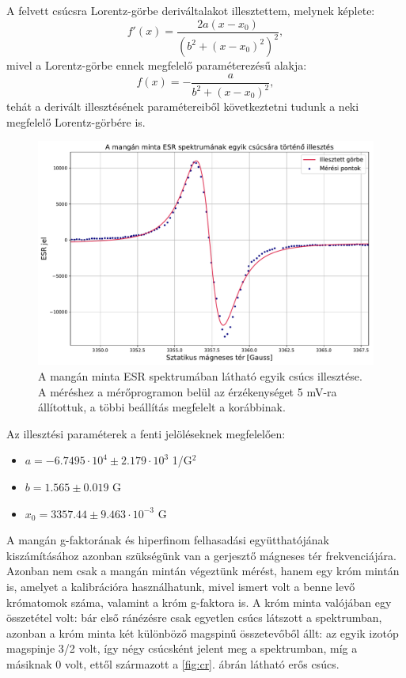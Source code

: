 \documentclass[12pt,a4paper]{article}
\begin{document}
\newline
A felvett csúcsra Lorentz-görbe deriváltalakot illesztettem, melynek képlete:
\begin{equation}
f'(x)=\frac{2a(x-x_{0})}{(b^2+(x-x_{0})^2)^2},
\end{equation}
mivel a Lorentz-görbe ennek megfelelő paraméterezésű alakja:
\begin{equation}
f(x)=- \frac{a}{b^2+(x-x_{0})^2},
\end{equation}
 tehát a derivált illesztésének paramétereiből következtetni tudunk a neki megfelelő Lorentz-görbére is.\\
\begin{figure}[!h]
\centering
\includegraphics[scale=0.5]{mang_reszl}
\caption{A mangán minta ESR spektrumában látható egyik csúcs illesztése. A méréshez a mérőprogramon belül az érzékenységet 5 mV-ra állítottuk, a többi beállítás megfelelt a korábbinak.}
\label{fig:mn_csucs}
\end{figure}
\newline
Az illesztési paraméterek a fenti jelöléseknek megfelelően:
\begin{itemize}
\item{$a=-6.7495 \cdot 10^{4} \pm 2.179 \cdot 10^{3}$ 1/G$^2$}
\item{$b=1.565 \pm 0.019$ G}
\item{$x_0=3357.44 \pm 9.463 \cdot 10^{-3}$ G}
\end{itemize}
\newpage
A mangán g-faktorának és hiperfinom felhasadási együtthatójának kiszámításához azonban szükségünk van a gerjesztő mágneses tér frekvenciájára. Azonban nem csak a mangán mintán végeztünk mérést, hanem egy króm mintán is, amelyet a kalibrációra használhatunk, mivel ismert volt a benne levő krómatomok száma, valamint a króm g-faktora is. A króm minta valójában egy összetétel volt: bár első ránézésre csak egyetlen csúcs látszott a spektrumban, azonban a króm minta két különböző magspinű összetevőből állt: az egyik izotóp magspinje 3/2 volt, így négy csúcsként jelent meg a spektrumban, míg a másiknak 0 volt, ettől származott a \ref{fig:cr}. ábrán látható erős csúcs.\\
\end{document}
